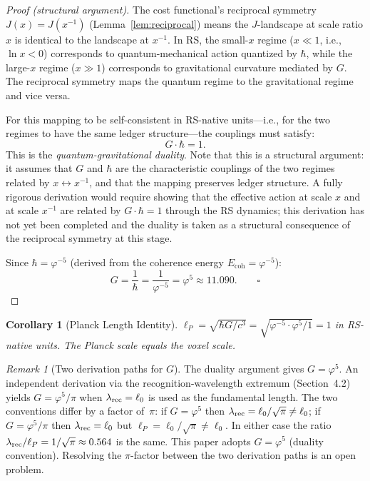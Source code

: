 \documentclass[12pt,a4paper]{article}
\newtheorem{corollary}[theorem]{Corollary}
\theoremstyle{definition}
\theoremstyle{remark}
\newtheorem{remark}[theorem]{Remark}
\begin{document}
\begin{proof}[Proof (structural argument)]
The cost functional's reciprocal symmetry $J(x) = J(x^{-1})$
(Lemma~\ref{lem:reciprocal}) means the $J$-landscape at scale
ratio $x$ is identical to the landscape at $x^{-1}$.  In RS, the
small-$x$ regime ($x \ll 1$, i.e., $\ln x < 0$) corresponds to
quantum-mechanical action quantized by $\hbar$, while the
large-$x$ regime ($x \gg 1$) corresponds to gravitational
curvature mediated by $G$.  The reciprocal symmetry maps the
quantum regime to the gravitational regime and vice versa.

For this mapping to be self-consistent in RS-native units---i.e.,
for the two regimes to have the same ledger structure---the
couplings must satisfy:
\begin{equation}
  G \cdot \hbar = 1.
  \label{eq:duality}
\end{equation}
This is the \emph{quantum-gravitational duality}.  Note that this
is a structural argument: it assumes that $G$ and $\hbar$ are the
characteristic couplings of the two regimes related by
$x \leftrightarrow x^{-1}$, and that the mapping preserves ledger
structure.  A fully rigorous derivation would require showing that
the effective action at scale $x$ and at scale $x^{-1}$ are related
by $G \cdot \hbar = 1$ through the RS dynamics; this derivation
has not yet been completed and the duality is taken as a structural
consequence of the reciprocal symmetry at this stage.

Since $\hbar = \varphi^{-5}$ (derived from the coherence energy
$E_{\mathrm{coh}} = \varphi^{-5}$):
\begin{equation}
  G = \frac{1}{\hbar} = \frac{1}{\varphi^{-5}} = \varphi^5
  \approx 11.090. \qquad \square
\end{equation}
\end{proof}

\begin{corollary}[Planck Length Identity]
\label{cor:planck}
$\ell_P = \sqrt{\hbar G / c^3} = \sqrt{\varphi^{-5} \cdot
\varphi^5 / 1} = 1$ in RS-native units.  The Planck scale
equals the voxel scale.
\end{corollary}

\begin{remark}[Two derivation paths for $G$]
\label{rem:two-paths}
The duality argument gives $G = \varphi^5$.  An independent
derivation via the recognition-wavelength extremum (Section~4.2)
yields $G = \varphi^5/\pi$ when $\lambda_{\rm rec} = \ell_0$ is
used as the fundamental length.  The two conventions differ by a
factor of~$\pi$: if $G = \varphi^5$ then
$\lambda_{\rm rec} = \ell_0/\sqrt{\pi} \neq \ell_0$; if
$G = \varphi^5/\pi$ then $\lambda_{\rm rec} = \ell_0$ but
$\ell_P = \ell_0/\sqrt{\pi} \neq \ell_0$.  In either case the
ratio $\lambda_{\rm rec}/\ell_P = 1/\sqrt{\pi} \approx 0.564$
is the same.  This paper adopts $G = \varphi^5$ (duality
convention).  Resolving the $\pi$-factor between the two
derivation paths is an open problem.
\end{remark}
\end{document}
